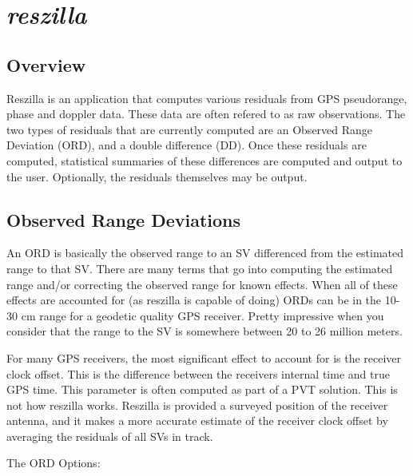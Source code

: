 %
%

\section{\emph{reszilla}}
\subsection{Overview}
Reszilla is an application that computes various residuals from GPS
pseudorange, phase and doppler data. These data are often refered to
as raw observations. The two types of residuals that are currently
computed are an Observed Range Deviation (ORD), and a double
difference (DD). Once these residuals are computed, statistical
summaries of these differences are computed and output to the
user. Optionally, the residuals themselves may be output.

\subsection{Observed Range Deviations}
An ORD is basically the observed range to an SV differenced from the
estimated range to that SV. There are many terms that go into
computing the estimated range and/or correcting the observed range for
known effects. When all of these effects are accounted for (as
reszilla is capable of doing) ORDs can be in the 10-30 cm range for a
geodetic quality GPS receiver. Pretty impressive when you consider
that the range to the SV is somewhere between 20 to 26 million meters.

For many GPS receivers, the most significant effect to account for is the receiver
clock offset. This is the difference between the receivers internal time and true
GPS time. This parameter is often computed as part of a PVT solution. This is not
how reszilla works. Reszilla is provided a surveyed position of the receiver
antenna, and it makes a more accurate estimate of the receiver clock offset by
averaging the residuals of all SVs in track.


The ORD Options:

